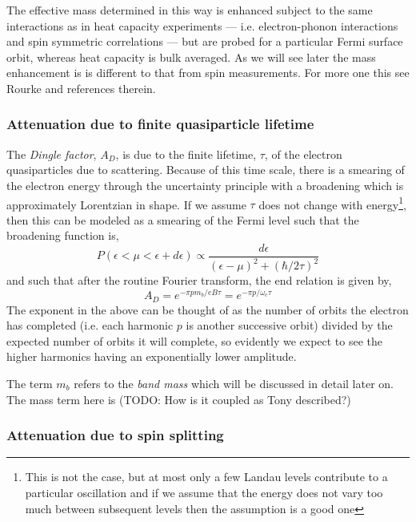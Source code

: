 The effective mass determined in this way is enhanced subject to the same interactions as in heat capacity experiments --- i.e. electron-phonon interactions and spin symmetric correlations --- but are probed for a particular Fermi surface orbit, whereas heat capacity is bulk averaged. As we will see later the mass enhancement is is different to that from spin measurements. For more one this see Rourke \etal\cite{Rourke2010b} and references therein.

\subsubsection{Attenuation due to finite quasiparticle lifetime}

The \textit{Dingle factor}, $A_D$, is due to the finite lifetime, $\tau$, of the electron quasiparticles due to scattering. Because of this time scale, there is a smearing of the electron energy through the uncertainty principle with a broadening which is approximately Lorentzian in shape. If we assume $\tau$ does not change with energy\footnote{This is not the case, but at most only a few Landau levels contribute to a particular oscillation and if we assume that the energy does not vary too much between subsequent levels then the assumption is a good one}, then this can be modeled as a smearing of the Fermi level such that the broadening function is,
\begin{equation}
  P(\epsilon < \mu < \epsilon + d\epsilon) \propto \frac{d\epsilon}{(\epsilon - \mu)^2 + (\hbar/2\tau)^2}
\end{equation}
and such that after the routine Fourier transform, the end relation is given by,
\begin{equation}
  A_D = e^{-\pi p m_b/e B\tau} = e^{-\pi p/\omega_c\tau} 
\label{Eqn:Theo:DingleTerm}
\end{equation}
The exponent in the above can be thought of as the number of orbits the electron has completed (i.e. each harmonic $p$ is another successive orbit) divided by the expected number of orbits it will complete, so evidently we expect to see the higher harmonics having an exponentially lower amplitude.

The term $m_b$ refers to the \textit{band mass} which will be discussed in detail later on. The mass term here is (TODO: How is it coupled as Tony described?)

\subsubsection{Attenuation due to spin splitting}

